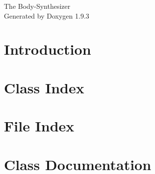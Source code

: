 \documentclass[twoside]{book}
\newcommand{\+}{\discretionary{\mbox{\scriptsize$\hookleftarrow$}}{}{}}
\newcommand{\clearemptydoublepage}{%
    \newpage{\pagestyle{empty}\cleardoublepage}%
  }
\begin{document}
  \raggedbottom
    \hypersetup{pageanchor=false,
                bookmarksnumbered=true,
                pdfencoding=unicode
               }
  \begin{titlepage}
  \vspace*{7cm}
  \begin{center}%
  {\Large The Body-\/\+Synthesizer}\\
  \vspace*{1cm}
  {\large Generated by Doxygen 1.9.3}\\
  \end{center}
  \end{titlepage}
  \clearemptydoublepage
  \tableofcontents
  \clearemptydoublepage
  \hypersetup{pageanchor=true}
\chapter{Introduction}
\label{index}\hypertarget{index}{}
\chapter{Class Index}

\chapter{File Index}

\chapter{Class Documentation}









\end{document}
